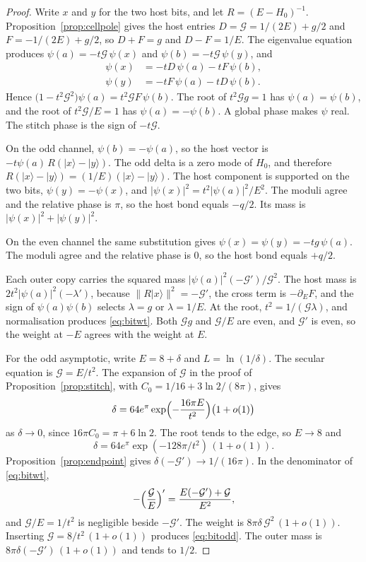 \begin{proof}
Write \(x\) and \(y\) for the two host bits, and let \(R=(E-H_0)^{-1}\).
Proposition~\ref{prop:cellpole} gives the host entries
\(D=\mathcal{G}=1/(2E)+g/2\) and \(F=-1/(2E)+g/2\), so
\(D+F=g\) and \(D-F=1/E\).
The eigenvalue equation produces
\(\psi(a)=-t\mathcal{G}\,\psi(x)\) and \(\psi(b)=-t\mathcal{G}\,\psi(y)\), and
\begin{align*}
\psi(x)&=-t D\,\psi(a)-t F\,\psi(b),\\
\psi(y)&=-t F\,\psi(a)-t D\,\psi(b).
\end{align*}
Hence
\(\bigl(1-t^2\mathcal{G}^2\bigr)\psi(a)=t^2\mathcal{G} F\,\psi(b)\).
The root of \(t^2\mathcal{G} g=1\) has \(\psi(a)=\psi(b)\), and the root of
\(t^2\mathcal{G}/E=1\) has \(\psi(a)=-\psi(b)\).
A global phase makes \(\psi\) real.
The stitch phase is the sign of \(-t\mathcal{G}\).

On the odd channel, \(\psi(b)=-\psi(a)\), so the host vector is
\(-t\psi(a)\,R(|x\rangle-|y\rangle)\).
The odd delta is a zero mode of \(H_0\), and therefore
\(R(|x\rangle-|y\rangle)=(1/E)(|x\rangle-|y\rangle)\).
The host component is supported on the two bits,
\(\psi(y)=-\psi(x)\), and
\(|\psi(x)|^2=t^2|\psi(a)|^2/E^2\).
The moduli agree and the relative phase is \(\pi\), so the host bond
equals \(-q/2\).
Its mass is \(|\psi(x)|^2+|\psi(y)|^2\).

On the even channel the same substitution gives
\(\psi(x)=\psi(y)=-t g\,\psi(a)\).
The moduli agree and the relative phase is \(0\), so the host bond equals
\(+q/2\).

Each outer copy carries the squared mass
\(|\psi(a)|^2(-\mathcal{G}')/\mathcal{G}^2\).
The host mass is \(2t^2|\psi(a)|^2(-\lambda')\), because
\(\|R|x\rangle\|^2=-\mathcal{G}'\), the cross term is \(-\partial_E F\), and
the sign of \(\psi(a)\psi(b)\) selects \(\lambda=g\) or \(\lambda=1/E\).
At the root, \(t^2=1/(\mathcal{G}\lambda)\), and normalisation produces
\eqref{eq:bitwt}.
Both \(\mathcal{G}g\) and \(\mathcal{G}/E\) are even, and \(\mathcal{G}'\) is
even, so the weight at \(-E\) agrees with the weight at \(E\).

For the odd asymptotic, write \(E=8+\delta\) and \(L=\ln(1/\delta)\).
The secular equation is \(\mathcal{G}=E/t^2\).
The expansion of \(\mathcal{G}\) in the proof of
Proposition~\ref{prop:stitch}, with
\(C_0=1/16+3\ln 2/(8\pi)\), gives
\[
\delta
=64 e^{\pi}
\exp\Bigl(-\frac{16\pi E}{t^2}\Bigr)
\bigl(1+o(1)\bigr)
\]
as \(\delta\to 0\), since \(16\pi C_0=\pi+6\ln 2\).
The root tends to the edge, so \(E\to 8\) and
\[
\delta=64 e^{\pi}\exp(-128\pi/t^2)\,(1+o(1)).
\]
Proposition~\ref{prop:endpoint} gives
\(\delta(-\mathcal{G}')\to 1/(16\pi)\).
In the denominator of \eqref{eq:bitwt},
\[
-\Bigl(\frac{\mathcal{G}}{E}\Bigr)'
=\frac{E(-\mathcal{G}')+\mathcal{G}}{E^2},
\]
and \(\mathcal{G}/E=1/t^2\) is negligible beside \(-\mathcal{G}'\).
The weight is \(8\pi\delta\,\mathcal{G}^2\,(1+o(1))\).
Inserting \(\mathcal{G}=8/t^2\,(1+o(1))\) produces \eqref{eq:bitodd}.
The outer mass is \(8\pi\delta(-\mathcal{G}')\,(1+o(1))\) and tends to \(1/2\).


\end{proof}
